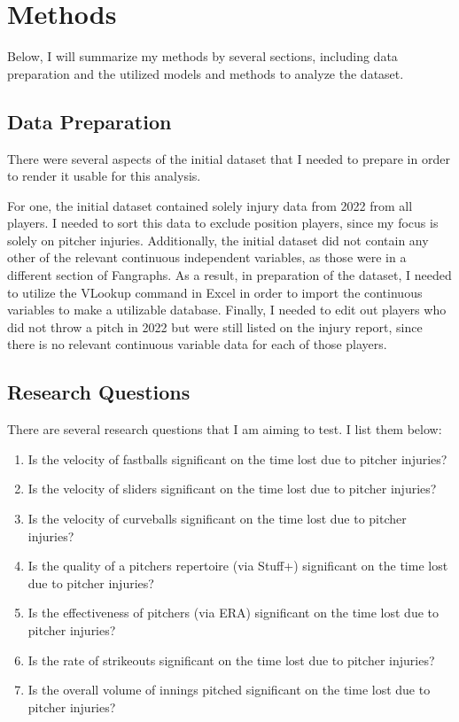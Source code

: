 \documentclass{article}
\begin{document}
\section{Methods}

Below, I will summarize my methods by several sections, including data preparation and the utilized models and methods to analyze the dataset.

\subsection{Data Preparation}

There were several aspects of the initial dataset that I needed to prepare in order to render it usable for this analysis. 

For one, the initial dataset contained solely injury data from 2022 from all players. I needed to sort this data to exclude position players, since my focus is solely on pitcher injuries. Additionally, the initial dataset did not contain any other of the relevant continuous independent variables, as those were in a different section of Fangraphs. As a result, in preparation of the dataset, I needed to utilize the VLookup command in Excel in order to import the continuous variables to make a utilizable database. Finally, I needed to edit out players who did not throw a pitch in 2022 but were still listed on the injury report, since there is no relevant continuous variable data for each of those players. 

\subsection{Research Questions}

There are several research questions that I am aiming to test. I list them below:

\begin{enumerate}
  \def\labelenumi{\arabic{enumi}.}
  \item
    Is the velocity of fastballs significant on the time lost due to pitcher injuries?
  \item
    Is the velocity of sliders significant on the time lost due to pitcher injuries?
  \item
    Is the velocity of curveballs significant on the time lost due to pitcher injuries?
  \item
    Is the quality of a pitchers repertoire (via Stuff+) significant on the time lost due to pitcher injuries?
  \item
    Is the effectiveness of pitchers (via ERA) significant on the time lost due to pitcher injuries?
  \item
    Is the rate of strikeouts significant on the time lost due to pitcher injuries?
  \item
    Is the overall volume of innings pitched significant on the time lost due to pitcher injuries?
\end{enumerate}
\end{document}

